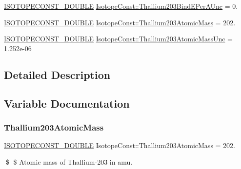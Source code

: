 \begin{DoxyCompactItemize}
\mbox{\hyperlink{group___isotope_const-_macros_ga8f45a7272ce02c0b4c65c44636ed719a}{I\+S\+O\+T\+O\+P\+E\+C\+O\+N\+S\+T\+\_\+\+D\+O\+U\+B\+LE}} \mbox{\hyperlink{group___isotope_const-_thallium-_tl203_ga6581995e062685549cf9cce7bc133ccd}{Isotope\+Const\+::\+Thallium203\+Bind\+E\+Per\+A\+Unc}} = 0.
\item 
\mbox{\hyperlink{group___isotope_const-_macros_ga8f45a7272ce02c0b4c65c44636ed719a}{I\+S\+O\+T\+O\+P\+E\+C\+O\+N\+S\+T\+\_\+\+D\+O\+U\+B\+LE}} \mbox{\hyperlink{group___isotope_const-_thallium-_tl203_ga39fb07a3b3cf76328eeab8da5cfcb553}{Isotope\+Const\+::\+Thallium203\+Atomic\+Mass}} = 202.
\item 
\mbox{\hyperlink{group___isotope_const-_macros_ga8f45a7272ce02c0b4c65c44636ed719a}{I\+S\+O\+T\+O\+P\+E\+C\+O\+N\+S\+T\+\_\+\+D\+O\+U\+B\+LE}} \mbox{\hyperlink{group___isotope_const-_thallium-_tl203_ga96e60eee368830e4532037325092da1a}{Isotope\+Const\+::\+Thallium203\+Atomic\+Mass\+Unc}} = 1.\+252e-\/06
\end{DoxyCompactItemize}


\subsection{Detailed Description}


\subsection{Variable Documentation}
\mbox{\label{group___isotope_const-_thallium-_tl203_ga39fb07a3b3cf76328eeab8da5cfcb553}} 
\subsubsection{\texorpdfstring{Thallium203\+Atomic\+Mass}{Thallium203AtomicMass}}
{\footnotesize\ttfamily \mbox{\hyperlink{group___isotope_const-_macros_ga8f45a7272ce02c0b4c65c44636ed719a}{I\+S\+O\+T\+O\+P\+E\+C\+O\+N\+S\+T\+\_\+\+D\+O\+U\+B\+LE}} Isotope\+Const\+::\+Thallium203\+Atomic\+Mass = 202.}

\$ \$ Atomic mass of Thallium-\/203 in amu. \mbox{\label{group___isotope_const-_thallium-_tl203_ga96e60eee368830e4532037325092da1a}} 
